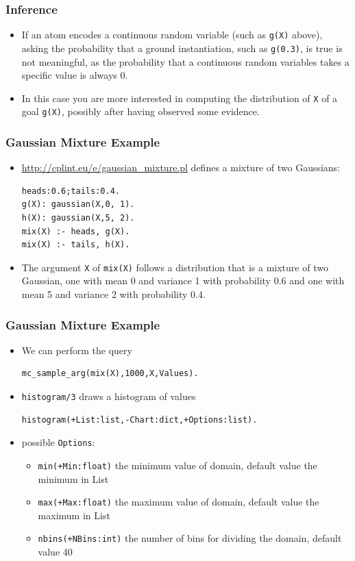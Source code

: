 \documentclass[trans]{beamer}
\begin{document}
\begin{frame}[fragile]
  \frametitle{Inference}
  \begin{itemize}
\item If an atom encodes a continuous random variable (such as \verb|g(X)| above), asking the probability that a ground instantiation, such as \verb|g(0.3)|, is true is not meaningful, as the probability that a continuous random variables takes a specific value is always 0.
\item In this case you are more interested in computing the distribution of \verb|X| of a goal \verb|g(X)|, possibly after having observed some evidence.
\end{itemize}
\end{frame}
\begin{frame}[fragile]
  \frametitle{Gaussian Mixture Example}
  \begin{itemize}
  \item
 \url{http://cplint.eu/e/gaussian_mixture.pl} defines a mixture of two Gaussians:
\begin{verbatim}
heads:0.6;tails:0.4.
g(X): gaussian(X,0, 1).
h(X): gaussian(X,5, 2).
mix(X) :- heads, g(X).
mix(X) :- tails, h(X).
\end{verbatim}
\item
The argument \verb|X| of
\verb|mix(X)| follows a distribution that is a mixture of two Gaussian,
one with mean 0 and variance 1 with probability 0.6 and one with 
mean 5 and variance 2 with probability 0.4.
\end{itemize}
\end{frame}
\begin{frame}[fragile]
  \frametitle{Gaussian Mixture Example}
  \begin{itemize}
\item We can  perform the query
\begin{verbatim}
mc_sample_arg(mix(X),1000,X,Values).
\end{verbatim}
\item \verb|histogram/3| draws a histogram of values
\begin{verbatim}
histogram(+List:list,-Chart:dict,+Options:list).
\end{verbatim}
\item possible \verb|Options|:
\begin{itemize}
\item \verb|min(+Min:float)| the minimum value of domain, default value the minimum in List
\item \verb|max(+Max:float)| the maximum value of domain, default value the maximum in List
\item \verb|nbins(+NBins:int)| the number of bins for dividing the domain, default value 40
\end{itemize}
\end{itemize}
\end{frame}
\end{document}
